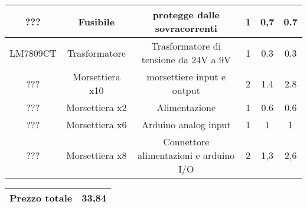 \documentclass[12pt]{article}
\begin{document}
\begin{center}
\begin{tabular}{| c | c | c | c| c |c|}
        \rowcolor{Apricot} ??? & Fusibile & protegge dalle sovracorrenti & 1 & 0,7 & 0.7\\
        \hline
        \rowcolor{Peach} LM7809CT & Trasformatore  & Trasformatore di tensione da 24V a 9V & 1 & 0.3 & 0.3\\
        \hline
        \rowcolor{Apricot} ??? & Morsettiera x10 & morsettiere input e output & 2 & 1.4 & 2.8\\
        \hline
        \rowcolor{Peach} ??? & Morsettiera x2 & Alimentazione & 1 & 0.6 & 0.6\\
        \hline
        \rowcolor{Apricot} ??? & Morsettiera x6 & Arduino analog input & 1 & 1 & 1\\
        \hline
        \rowcolor{Peach} ??? & Morsettiera x8 & Connettore alimentazioni e arduino I/O & 2 & 1,3 & 2,6\\
        \hline
   \end{tabular}
   \vskip 2mm
   \begin{tabular}[h]{|p{4cm}| p{3cm}|  }
       \hline
        \rowcolor{BurntOrange} Prezzo totale & \cellcolor{white} \hspace{1cm} 33,84\\ 
        \hline
   \end{tabular}
   \end{center}
\vfill
\vskip 4mm 
\end{document}
